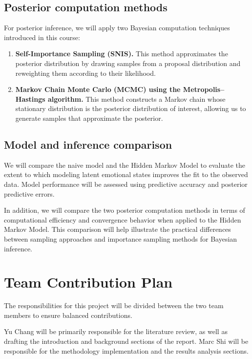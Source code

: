 \documentclass[a4paper,11pt]{article}
\begin{document}
\subsection{Posterior computation methods}

For posterior inference, we will apply two Bayesian computation techniques introduced 
in this course:

\begin{enumerate}

\item \textbf{Self-Importance Sampling (SNIS).}  
This method approximates the posterior distribution by drawing samples from a proposal 
distribution and reweighting them according to their likelihood.

\item \textbf{Markov Chain Monte Carlo (MCMC) using the Metropolis--Hastings algorithm.}  
This method constructs a Markov chain whose stationary distribution is the posterior 
distribution of interest, allowing us to generate samples that approximate the posterior.

\end{enumerate}

\subsection{Model and inference comparison}

We will compare the naive model and the Hidden Markov Model to evaluate the extent to 
which modeling latent emotional states improves the fit to the observed data. Model 
performance will be assessed using predictive accuracy and posterior predictive errors.

In addition, we will compare the two posterior computation methods in terms of 
computational efficiency and convergence behavior when applied to the Hidden Markov 
Model. This comparison will help illustrate the practical differences between sampling 
approaches and importance sampling methods for Bayesian inference.


\section{Team Contribution Plan}

The responsibilities for this project will be divided between the two team members to ensure balanced contributions.

Yu Chang will be primarily responsible for the literature review, as well as drafting the introduction and background sections of the report. Marc Shi will be responsible for the methodology implementation and the results analysis sections.
\end{document}
